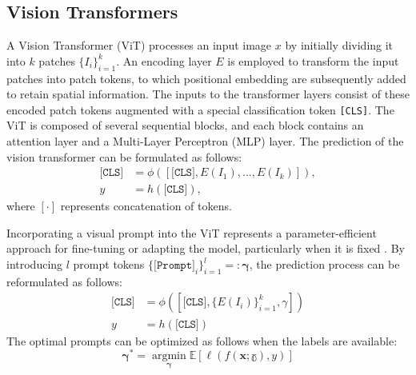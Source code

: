 \documentclass[11pt,a4paper]{article}
\begin{document}
\subsection{Vision Transformers}
\label{sec:vit}
A Vision Transformer (ViT) \cite{dosovitskiy2021an, liu2021swin} processes an input image $x$ by initially dividing it into $k$ patches $\{I_i\}_{i=1}^k$. 
An encoding layer $E$ is employed to transform the input patches into patch tokens, to which positional embedding are subsequently added to retain spatial information. 
The inputs to the transformer layers consist of these encoded patch tokens augmented with a special classification token \verb|[CLS]|. 
The ViT is composed of several sequential blocks, and each block contains an attention layer and a Multi-Layer Perceptron  (MLP) layer. 
The prediction of the vision transformer can be formulated as follows:
\begin{equation}
\begin{aligned}
    \texttt{[CLS]} &= \phi([\texttt{[CLS]}, E(I_1), ..., E(I_k)]), \\
    y &= h(\texttt{[CLS]}),
\end{aligned}
\end{equation}
where $[\cdot]$ represents concatenation of tokens. 

Incorporating a visual prompt into the ViT represents a parameter-efficient approach for fine-tuning or adapting the model, particularly when it is fixed \cite{jia2022visual, ge2023domain}. 
By introducing $l$ prompt tokens $\{\texttt{[Prompt]}_i\}_{i=1}^l=: \mathbf{\gamma}$, the prediction process can be reformulated as follows:
\begin{equation}
\begin{aligned}
    \texttt{[CLS]} &= \phi([\texttt{[CLS]}, \{E(I_i)\}_{i=1}^k, \gamma]) \\
    y &= h(\texttt{[CLS]})
\end{aligned}
\label{eq:infer_with_prompt}
\end{equation}
The optimal prompts can be optimized as follows when the labels are available:
\begin{equation}
\label{eq:supervised_vp}
    \mathbf{\gamma}^* = \mathop{\arg \min}\limits_{\mathbf{\gamma}} \mathbb{E}[\ell(f(\mathbf{x}; \mathbb{\gamma}), y)]
\end{equation}
\end{document}
